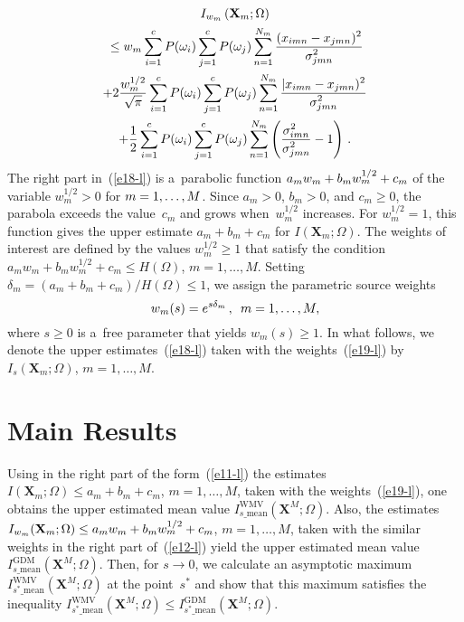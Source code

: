 \begin{multicols}{2}
\noindent
\begin{multline}
I_{w_m}\left(\mathbf{X}_m;\Omega\right) \\
{}\leq w_m \sum\limits^c_{i=1} 
P(\omega_i) \sum\limits^c_{j=1} P(\omega_j) \sum\limits_{n=1}^{N_m} 
\displaystyle\frac{\displaystyle (x_{imn}-x_{jmn})^2\mathstrut}{\displaystyle \sigma^2_{jmn}\mathstrut}\\
+2\displaystyle\frac{\displaystyle w_m^{1/2}\mathstrut}{\displaystyle \sqrt{\pi}\mathstrut} \sum\limits^c_{i=1} P(\omega_i) 
\sum\limits^c_{j=1} P(\omega_j) \sum\limits_{n=1}^{N_m} \displaystyle\frac{\displaystyle \vert x_{imn} -
x_{jmn})^2\mathstrut}{\displaystyle \sigma^2_{jmn}\mathstrut}\\
+\displaystyle\frac{\displaystyle 1\mathstrut}{\displaystyle 2\mathstrut}\sum\limits^c_{i=1}P(\omega_i) \sum\limits_{j=1}^c P(\omega_j) 
\sum\limits^{N_m}_{n=1} \left( \displaystyle\frac{\displaystyle \sigma^2_{imn}\mathstrut}{\displaystyle \sigma^2_{jmn}\mathstrut}-
1\right)\,.
\label{e18-l}
\end{multline}
The right part in~(\ref{e18-l}) is a~parabolic function 
$a_mw_m\linebreak +b_mw_m^{1/2}+c_m$ of the variable $w_m^{1/2}>0$ for 
$m\linebreak =1,\ldots , M$. Since $a_m>0$, $b_m>0$, and $c_m\geq0$, the parabola 
exceeds the value~$c_m$ and grows when~$w_m^{1/2}$ increases.  For 
$w_m^{1/2}=1$, this function gives the upper estimate $a_m+b_m+c_m$ for 
$I(\mathbf{X}_m;\Omega)$. The weights of interest are defined by the values 
$w_m^{1/2}\geq 1$ that satisfy the condition 
$a_mw_m+b_mw_m^{1/2}+c_m\leq H(\Omega)$, $m=1, \ldots , M$. Setting 
$\delta_m=(a_m+b_m+c_m)/H(\Omega)\leq 1$, we assign the parametric source 
weights 
\begin{equation}
w_m(s)=e^{s\delta_m}\,,\enskip m=1,\ldots , M,
\label{e19-l}
\end{equation}
where $s\geq 0$ is a~free parameter that yields $w_m(s)\geq 1$. In what follows, 
we denote the upper estimates~(\ref{e18-l}) taken with the weights~(\ref{e19-l}) 
by $I_s(\mathbf{X}_m;\Omega)$, $m=1,\ldots , M$.

\section{Main Results}

\noindent
   Using in the right part of the form~(\ref{e11-l}) the estimates 
$I(\mathbf{X}_m;\Omega)\leq a_m+b_m+c_m$, $m=1,\ldots , M$, taken with the 
weights~(\ref{e19-l}), one obtains the upper estimated mean value 
$I^{\mathrm{WMV}}_{s\_\mathrm{mean}} (\mathbf{X}^M;\Omega)$.  Also, the estimates 
$I_{w_m}(\mathbf{X}_m;\Omega)\linebreak \leq a_mw_m+b_m w_m^{1/2}+c_m$, 
$m=1,\ldots , M$, taken with the similar weights in the right part of~(\ref{e12-l}) 
yield the upper estimated mean value $I^{\mathrm{GDM}}_{s\_\mathrm{mean}} 
(\mathbf{X}^M;\Omega)$. Then, for $s\to 0$, we calculate an asymptotic 
maximum $I^{\mathrm{WMV}}_{s^*\_\mathrm{mean}}(\mathbf{X}^M;\Omega)$ at the point~$s^*$ 
and show that this maximum satisfies the inequality 
$I^{\mathrm{WMV}}_{s^*\_\mathrm{mean}}(\mathbf{X}^M;\Omega) \leq 
I^{\mathrm{GDM}}_{s^*\_\mathrm{mean}}(\mathbf{X}^M;\Omega)$.


\end{multicols}
